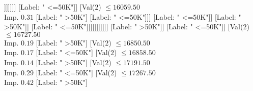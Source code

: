 \documentclass[margin=10pt]{standalone}
\begin{document}
\begin{forest}
																														[Val($2$) $ \leq 16106.50$ \\ Imp. $0.06$
																															[Val($2$) $ \leq 16034.50$ \\ Imp. $0.11$
																																[Val($2$) $ \leq 15947.50$ \\ Imp. $0.04$
																																	[Val($2$) $ \leq 14977.50$ \\ Imp. $0.02$
																																		[Label: " <=50K"]
																																		[Val($2$) $ \leq 14992.50$ \\ Imp. $0.02$
																																			[Label: " >50K"]
																																			[Val($2$) $ \leq 15153.50$ \\ Imp. $0.09$
																																				[Label: " <=50K"]
																																				[Val($2$) $ \leq 15239.50$ \\ Imp. $0.14$
																																					[Label: " >50K"]
																																					[Val($2$) $ \leq 15287.50$ \\ Imp. $0.08$
																																						[Label: " <=50K"]
																																						[Val($2$) $ \leq 15322.50$ \\ Imp. $0.19$
																																							[Label: " >50K"]
																																							[Label: " <=50K"]]]]]]]
																																	[Label: " <=50K"]]
																																[Val($2$) $ \leq 16059.50$ \\ Imp. $0.31$
																																	[Label: " >50K"]
																																	[Label: " <=50K"]]]
																															[Label: " <=50K"]]
																														[Label: " >50K"]]
																													[Label: " <=50K"]]]]]]]]]]]
																			[Label: " >50K"]]
																		[Label: " <=50K"]]
																	[Val($2$) $ \leq 16727.50$ \\ Imp. $0.19$
																		[Label: " >50K"]
																		[Val($2$) $ \leq 16850.50$ \\ Imp. $0.17$
																			[Label: " <=50K"]
																			[Val($2$) $ \leq 16858.50$ \\ Imp. $0.14$
																				[Label: " >50K"]
																				[Val($2$) $ \leq 17191.50$ \\ Imp. $0.29$
																					[Label: " <=50K"]
																					[Val($2$) $ \leq 17267.50$ \\ Imp. $0.42$
																						[Label: " >50K"]

\end{forest}
\end{document}
